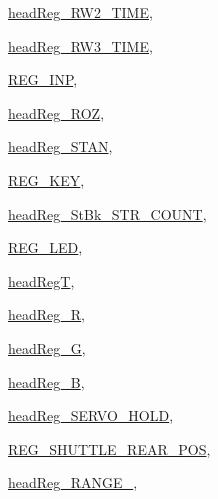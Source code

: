 \begin{DoxyCompactItemize}
\begin{DoxyCompactItemize}
\item\mbox{\hyperlink{classRegister_ac62b4973b5619eb86226477da8f02599a9cfc600450a1d6056bef3096c1647fd8}{head\+Reg\+\_\+\+R\+W2\+\_\+\+T\+I\+ME}}, 
\item\mbox{\hyperlink{classRegister_ac62b4973b5619eb86226477da8f02599a9fa2f996e5ea3ea8d86f40cfc0d57ae9}{head\+Reg\+\_\+\+R\+W3\+\_\+\+T\+I\+ME}}, 
\item\mbox{\hyperlink{classRegister_ac62b4973b5619eb86226477da8f02599aaa9522cabe34a2b90f0b13e19248016c}{R\+E\+G\+\_\+\+I\+NP}}, 
\item\mbox{\hyperlink{classRegister_ac62b4973b5619eb86226477da8f02599af8a4f6b03a71bfdb3ad55d17217b2f46}{head\+Reg\+\_\+\+R\+OZ}}, 
\item\mbox{\hyperlink{classRegister_ac62b4973b5619eb86226477da8f02599a3c9eeee06e924bd8781bd0bdcbc9dbdc}{head\+Reg\+\_\+\+S\+T\+AN}}, 
\item\mbox{\hyperlink{classRegister_ac62b4973b5619eb86226477da8f02599ab9e8247f60dd80c29b908c7d0d4ef7a2}{R\+E\+G\+\_\+\+K\+EY}}, 
\item\mbox{\hyperlink{classRegister_ac62b4973b5619eb86226477da8f02599a8dccdba020ff610e5dd69fb39f96f13b}{head\+Reg\+\_\+\+St\+Bk\+\_\+\+S\+T\+R\+\_\+\+C\+O\+U\+NT}}, 
\item\mbox{\hyperlink{classRegister_ac62b4973b5619eb86226477da8f02599a558068a43332ed22849f58f0b3c03e6b}{R\+E\+G\+\_\+\+L\+ED}}, 
\item\mbox{\hyperlink{classRegister_ac62b4973b5619eb86226477da8f02599acd0bdf109c424ea037a92ba3b4426e92}{head\+RegT}}, 
\item\mbox{\hyperlink{classRegister_ac62b4973b5619eb86226477da8f02599ae1337db84f83adefdb8b910903b5928e}{head\+Reg\+\_\+R}}, 
\item\mbox{\hyperlink{classRegister_ac62b4973b5619eb86226477da8f02599afafa488a9eb0017468ac35cd4cec3b01}{head\+Reg\+\_\+G}}, 
\item\mbox{\hyperlink{classRegister_ac62b4973b5619eb86226477da8f02599a023c1b1e5c1a076cc4840fc449de103e}{head\+Reg\+\_\+B}}, 
\item\mbox{\hyperlink{classRegister_ac62b4973b5619eb86226477da8f02599a196f235e83c540e0c5517a6fb8537b48}{head\+Reg\+\_\+\+S\+E\+R\+V\+O\+\_\+\+H\+O\+LD}}, 
\item\mbox{\hyperlink{classRegister_ac62b4973b5619eb86226477da8f02599a35d01a042e64fd4b3d1382fe85641b92}{R\+E\+G\+\_\+\+S\+H\+U\+T\+T\+L\+E\+\_\+\+R\+E\+A\+R\+\_\+\+P\+OS}}, 
\item\mbox{\hyperlink{classRegister_ac62b4973b5619eb86226477da8f02599adac02cde5d7dc1e4b51b6e34f48251de}{head\+Reg\+\_\+\+R\+A\+N\+G\+E\+\_}}, 

\end{DoxyCompactItemize}
\end{DoxyCompactItemize}
